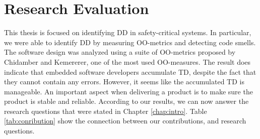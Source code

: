 



\section{Research Evaluation}
\label{sec:disc:researcheva}


This thesis is focused on identifying DD in safety-critical systems. In particular, we were able to identify DD by measuring OO-metrics and detecting code smells. The software design was analyzed using a suite of OO-metrics proposed by Chidamber and Kemererer, one of the most used OO-measures. The result does indicate that embedded software developers accumulate TD, despite the fact that they cannot contain any errors\cite{pretschner2007software,ebert2009embedded,trienekens2010quality}. However, it seems like the accumulated TD is manageable. An important aspect when delivering a product is to make sure the product is stable and reliable. According to our results, we can now answer the research questions that were stated in Chapter \ref{chap:intro}. Table \ref{tab:conribution} show the connection between our contributions, and research questions.

